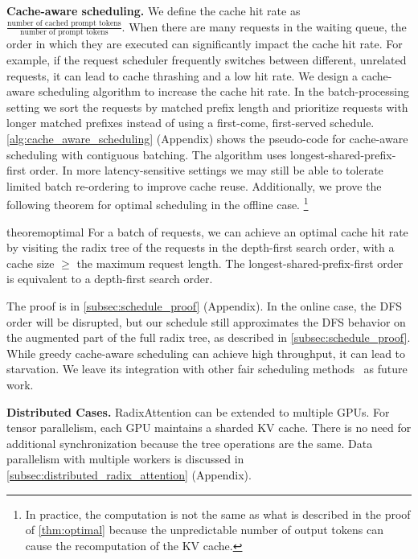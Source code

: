 \textbf{Cache-aware scheduling.}
We define the cache hit rate as $\frac{\text{number of cached prompt tokens}}{\text{number of prompt tokens}}$. 
When there are many requests in the waiting queue, the order in which they are executed can significantly impact the cache hit rate. For example, if the request scheduler frequently switches between different, unrelated requests, it can lead to cache thrashing and a low hit rate.
We design a cache-aware scheduling algorithm to increase the cache hit rate. 
In the batch-processing setting we
sort the requests by matched prefix length and prioritize requests with longer matched prefixes instead of using a first-come, first-served schedule. \autoref{alg:cache_aware_scheduling} (Appendix) shows the pseudo-code for cache-aware scheduling with contiguous batching. The algorithm uses longest-shared-prefix-first order.
In more latency-sensitive settings we may still be able to tolerate limited batch re-ordering to improve cache reuse. 
Additionally, we prove the following theorem for optimal scheduling in the offline case.
\footnote{In practice, the computation is not the same as what is described in the proof of \autoref{thm:optimal} because the unpredictable number of output tokens can cause the recomputation of the KV cache.}

\vspace{-0.2em}
\begin{restatable}{theorem}{optimal}
\label{thm:optimal}
For a batch of requests, we can achieve an optimal cache hit rate by visiting the radix tree of the requests in the depth-first search order, with a cache size $\geq$ the maximum request length. The longest-shared-prefix-first order is equivalent to a depth-first search order.
\end{restatable}
\vspace{-0.2em}

The proof is in \autoref{subsec:schedule_proof} (Appendix).
In the online case, the DFS order will be disrupted, but our schedule still approximates the DFS behavior on the augmented part of the full radix tree, as described in \autoref{subsec:schedule_proof}.
While greedy cache-aware scheduling can achieve high throughput, it can lead to starvation. We leave its integration with other fair scheduling methods~\cite{sheng2023fairness} as future work.

\textbf{Distributed Cases.} RadixAttention can be extended to multiple GPUs. For tensor parallelism, each GPU maintains a sharded KV cache. There is no need for additional synchronization because the tree operations are the same.
Data parallelism with multiple workers is discussed in \autoref{subsec:distributed_radix_attention} (Appendix).















